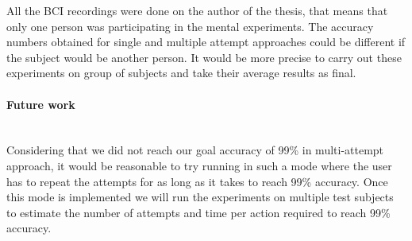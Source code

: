 \documentclass[12pt]{article}
\theoremstyle{definition}
\begin{document}
All the BCI recordings were done on the author of the thesis, that means that only one person was participating in the mental experiments. The accuracy numbers obtained for single and multiple attempt approaches could be different if the subject would be another person. It would be more precise to carry out these experiments on group of subjects and take their average results as final.

\paragraph{Future work}~\\

Considering that we did not reach our goal accuracy of 99\% in multi-attempt approach, it would be reasonable to try running in such a mode where the user has to repeat the attempts for as long as it takes to reach 99\% accuracy. Once this mode is implemented we will run the experiments on multiple test subjects to estimate the number of attempts and time per action required to reach 99\% accuracy.

\newpage



\newpage
\end{document}
